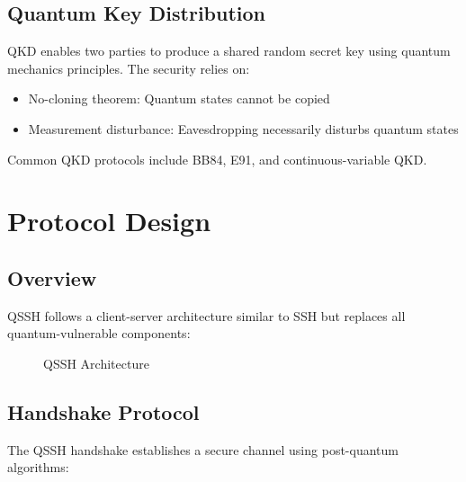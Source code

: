 \documentclass[11pt,a4paper]{article}
\begin{document}
\subsection{Quantum Key Distribution}

QKD enables two parties to produce a shared random secret key using quantum mechanics principles. The security relies on:
\begin{itemize}
    \item No-cloning theorem: Quantum states cannot be copied
    \item Measurement disturbance: Eavesdropping necessarily disturbs quantum states
\end{itemize}

Common QKD protocols include BB84, E91, and continuous-variable QKD.

\section{Protocol Design}

\subsection{Overview}

QSSH follows a client-server architecture similar to SSH but replaces all quantum-vulnerable components:

\begin{figure}[h]
\centering
{}
\caption{QSSH Architecture}
\end{figure}

\subsection{Handshake Protocol}

The QSSH handshake establishes a secure channel using post-quantum algorithms:
\end{document}
